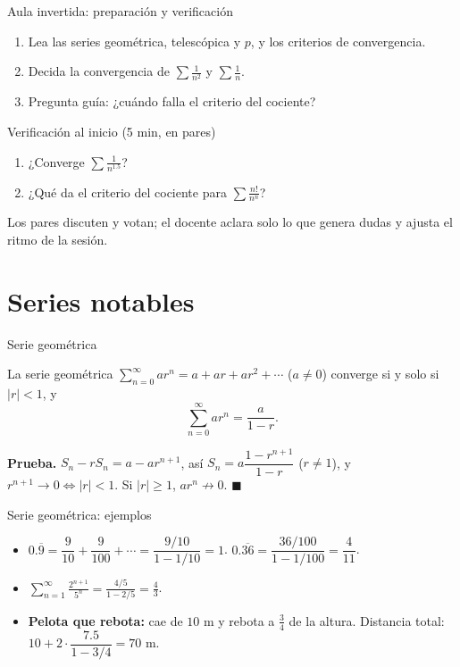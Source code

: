 \documentclass[10pt,aspectratio=169]{beamer}
\begin{document}
\begin{frame}{Aula invertida: preparación y verificación}
  \small
  \begin{previa}
    \begin{enumerate}
      \item Lea las series geométrica, telescópica y $p$, y los criterios de convergencia.
      \item Decida la convergencia de $\sum\frac1{n^2}$ y $\sum\frac1n$.
      \item Pregunta guía: ¿cuándo falla el criterio del cociente?
    \end{enumerate}
  \end{previa}
  \begin{block}{Verificación al inicio (5 min, en pares)}
    \begin{enumerate}
      \item ¿Converge $\sum\frac1{n^{1.5}}$?
      \item ¿Qué da el criterio del cociente para $\sum\frac{n!}{n^n}$?
    \end{enumerate}
    Los pares discuten y votan; el docente aclara solo lo que genera dudas y ajusta el ritmo de la sesión.
  \end{block}
\end{frame}

\section{Series notables}

\begin{frame}{Serie geométrica}
  \begin{teorema}
    La serie geométrica $\displaystyle\sum_{n=0}^\infty ar^n=a+ar+ar^2+\cdots$ ($a\ne0$) converge si y solo si $|r|<1$, y
    \[ \sum_{n=0}^\infty ar^n=\frac{a}{1-r}. \]
  \end{teorema}
  \textbf{Prueba.} $S_n-rS_n=a-ar^{n+1}$, así $S_n=a\dfrac{1-r^{n+1}}{1-r}$ ($r\ne1$), y $r^{n+1}\to0\iff|r|<1$. Si $|r|\ge1$, $ar^n\not\to0$. $\blacksquare$
\end{frame}

\begin{frame}{Serie geométrica: ejemplos}
  \begin{ejemplo}
    \begin{itemize}
      \item $0.\overline{9}=\dfrac9{10}+\dfrac9{100}+\cdots=\dfrac{9/10}{1-1/10}=1$. \qquad
        $0.\overline{36}=\dfrac{36/100}{1-1/100}=\dfrac{4}{11}$.
      \item $\displaystyle\sum_{n=1}^\infty\frac{2^{n+1}}{5^n}=\frac{4/5}{1-2/5}=\frac43$.
      \item \textbf{Pelota que rebota:} cae de $10$ m y rebota a $\frac34$ de la altura. Distancia total:
        $10+2\cdot\dfrac{7.5}{1-3/4}=70$ m.
    \end{itemize}
  \end{ejemplo}
\end{frame}
\end{document}
